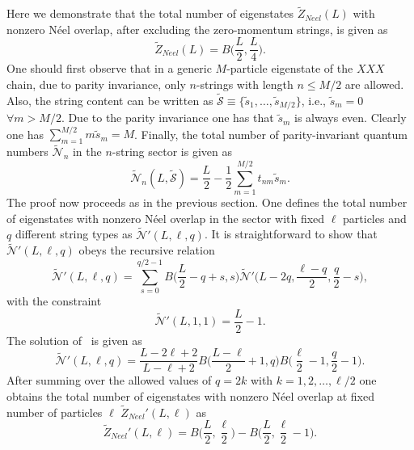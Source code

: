 \documentclass[11pt]{iopart}
\begin{document}
Here we demonstrate that the total number of eigenstates $\widetilde Z_{Neel}(L)$ 
with nonzero N\'eel overlap, after excluding the zero-momentum strings, is given as 
%
\begin{equation}
\label{result}
\widetilde Z_{Neel}(L)=B\Big(\frac{L}{2},\frac{L}{4}\Big). 
\end{equation}
One should first observe that in a generic $M$-particle eigenstate of the $XXX$ chain, 
due to parity invariance, only $n$-strings with length $n\le M/2$ are allowed. Also, the 
string content can be written as $\widetilde{\mathcal S}\equiv\{\tilde s_1,\dots,\tilde 
s_{M/2}\}$, i.e., $\tilde s_m=0$ $\forall m>M/2$. Due to the parity invariance 
one has that $\tilde s_m$ is always even. Clearly one has $\sum_{m=1}^{M/2}m \tilde 
s_m=M$. Finally, the total number of parity-invariant quantum numbers $\widetilde{
\mathcal N}_n$ in the $n$-string sector is given as  
%
\begin{equation}
\widetilde{\mathcal N}_n(L,\widetilde{\mathcal S})=\frac{L}{2}-\frac{1}{2}
\sum_{m=1}^{M/2}t_{nm}\tilde s_m.
\end{equation}
%
The proof now proceeds as in the previous section. One defines the total number of eigenstates 
with nonzero N\'eel overlap in the sector with fixed $\ell$ particles and $q$ different 
string types as $\widetilde{\mathcal N}'(L,\ell,q)$. It is straightforward to show that 
$\widetilde{\mathcal N}'(L,\ell,q)$ obeys the recursive relation
%
\begin{equation}
\label{NpLlq-1}
\widetilde{\mathcal N}'(L,\ell,q)=\sum_{s=0}^{q/2-1}B\Big(\frac{L}{2}-q+s,s\Big)\widetilde
{\mathcal N}'\Big(L-2q,\frac{\ell-q}{2},\frac{q}{2}-s\Big),
\end{equation}
% 
with the constraint
%
\begin{equation}
\widetilde{\mathcal N}'(L,1,1)=\frac{L}{2}-1. 
\end{equation}
%
The solution of~ is given as 
%
\begin{equation}
\widetilde{\mathcal N}'(L,\ell,q)=\frac{L-2\ell+2}{L-\ell+2}B\Big(\frac{L-\ell}{2}+1,q\Big)
B\Big(\frac{\ell}{2}-1,\frac{q}{2}-1\Big).
\end{equation}
%
After summing over the allowed values of $q=2k$ with $k=1,2,\dots,\ell/2$ one obtains 
the total number of eigenstates with nonzero N\'eel overlap at fixed number of 
particles $\ell$ $\widetilde Z_{Neel}'(L,\ell)$ as 
%
\begin{equation}
\label{Neel-fi}
\widetilde Z_{Neel}'(L,\ell)=B\Big(\frac{L}{2},\frac{\ell}{2}\Big)-
B\Big(\frac{L}{2},\frac{\ell}{2}-1\Big).
\end{equation}
\end{document}
